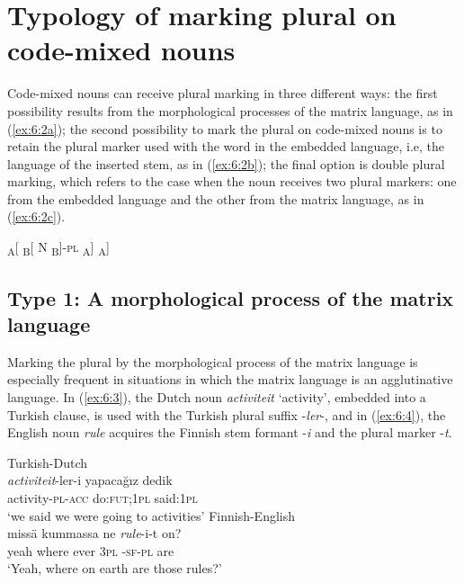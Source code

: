 \section{Typology of marking plural on code-mixed nouns}

Code-mixed nouns can receive plural marking in three different ways: the first possibility  results from the morphological processes of the matrix language, as in (\ref{ex:6:2a}); the second possibility to mark the plural on code-mixed nouns is to retain the plural marker used with the word in the embedded language, i.e, the language of the inserted stem, as in (\ref{ex:6:2b}); the final option is double plural marking, which refers to the case when the noun receives two plural markers: one from the embedded language and the other from the matrix language, as in (\ref{ex:6:2c}).

\ea 
\ea
	\textsubscript{A}[ \textsubscript{B}[ N \textsubscript{B}]-\textsc{pl} \textsubscript{A}]\label{ex:6:2a}
\label{ex:6:2b}
\ex	{\textsubscript{A}[ \textsubscript{B}[ N-\textsc{pl} \textsubscript{B}]-\textsc{pl}}\textsubscript{A}]\label{ex:6:2c}
\z
\z

\subsection{Type 1: A morphological process of the matrix language}

Marking the plural by the morphological process of the matrix language is especially frequent in situations in which the matrix language is an agglutinative language. In (\ref{ex:6:3}), the Dutch noun \textit{activiteit} `activity', embedded into a Turkish clause, is used with the Turkish plural suffix -\textit{ler}-, and in (\ref{ex:6:4}), the English noun \textit{rule} acquires the Finnish stem formant -\textit{i} and the plural marker -\textit{t}. 

\ea
\label{ex:6:3}
Turkish-Dutch \citep[150]{backus-two-1996}\\
\gll \textit{activiteit}-ler-i {yapacağız} {dedik}\\
	activity-\textsc{pl-acc} do:\textsc{fut;1pl} said:\textsc{1pl}\\
\glt `we said we were going to activities'
\ex
\label{ex:6:4}
Finnish-English \citep[60]{halmari-government-1997}\\
 {missä} {kummassa} {ne} \textit{rule}-i-t {on}?\\
	yeah where ever \textsc{3pl} {\phantom{mm}}-\textsc{sf-pl} are\\
\glt `Yeah, where on earth are those rules?'
\z

